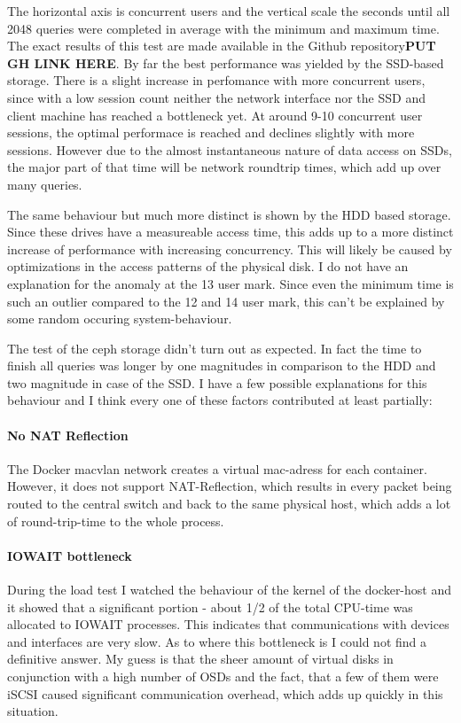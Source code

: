 \documentclass[titlepage, a4paper, 11pt]{scrartcl}
\begin{document}
                The horizontal axis is concurrent users and the vertical scale the seconds until all 2048 queries were completed in average with the minimum and maximum time. The exact results of this test are made available in the Github repository\textbf{PUT GH LINK HERE}. By far the best performance was yielded by the SSD-based storage. There is a slight increase in perfomance with more concurrent users, since with a low session count neither the network interface nor the SSD and client machine has reached a bottleneck yet.
                At around 9-10 concurrent user sessions, the optimal performace is reached and declines slightly with more sessions. However due to the almost instantaneous nature of data access on SSDs, the major part of that time will be network roundtrip times, which add up over many queries.

                The same behaviour but much more distinct is shown by the HDD based storage. Since these drives have a measureable access time, this adds up to a more distinct increase of performance with increasing concurrency.
                This will likely be caused by optimizations in the access patterns of the physical disk. I do not have an explanation for the anomaly at the 13 user mark. Since even the minimum time is such an outlier compared to the 12 and 14 user mark, this can't be explained by some random occuring system-behaviour.

                The test of the ceph storage didn't turn out as expected. In fact the time to finish all queries was longer by one magnitudes in comparison to the HDD and two magnitude in case of the SSD.
                I have a few possible explanations for this behaviour and I think every one of these factors contributed at least partially:
                
                \paragraph{No NAT Reflection} The Docker macvlan network creates a virtual mac-adress for each container. However, it does not support NAT-Reflection, which results in every packet being routed to the central switch and back to the same physical host, which adds a lot of round-trip-time to the whole process.

                \paragraph{IOWAIT bottleneck} During the load test I watched the behaviour of the kernel of the docker-host and it showed that a significant portion - about 1/2 of the total CPU-time was allocated to IOWAIT processes. This indicates that communications with devices and interfaces are very slow. As to where this bottleneck is I could not find a definitive answer. My guess is that the sheer amount of virtual disks in conjunction with a high number of OSDs and the fact, that a few of them were iSCSI caused significant communication overhead, which adds up quickly in this situation.
\end{document}
